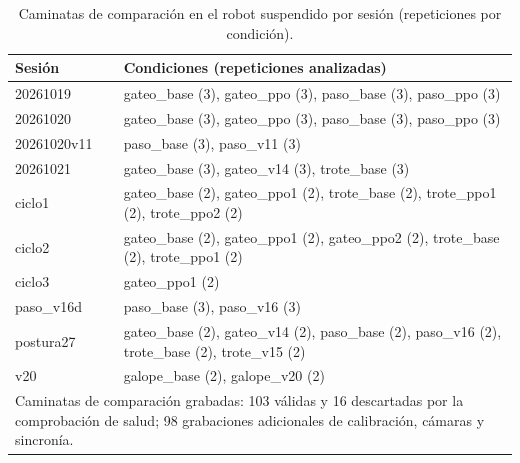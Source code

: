 \begin{table}[H]
\centering
\small
\caption{Caminatas de comparación en el robot suspendido por sesión (repeticiones por condición).}
\label{tab:inventario-ensayos}
\begin{tabular}{l>{\raggedright\arraybackslash}p{}}
\toprule
Sesión & Condiciones (repeticiones analizadas) \\
\midrule
20261019 & gateo\_base (3), gateo\_ppo (3), paso\_base (3), paso\_ppo (3) \\
20261020 & gateo\_base (3), gateo\_ppo (3), paso\_base (3), paso\_ppo (3) \\
20261020v11 & paso\_base (3), paso\_v11 (3) \\
20261021 & gateo\_base (3), gateo\_v14 (3), trote\_base (3) \\
ciclo1 & gateo\_base (2), gateo\_ppo1 (2), trote\_base (2), trote\_ppo1 (2), trote\_ppo2 (2) \\
ciclo2 & gateo\_base (2), gateo\_ppo1 (2), gateo\_ppo2 (2), trote\_base (2), trote\_ppo1 (2) \\
ciclo3 & gateo\_ppo1 (2) \\
paso\_v16d & paso\_base (3), paso\_v16 (3) \\
postura27 & gateo\_base (2), gateo\_v14 (2), paso\_base (2), paso\_v16 (2), trote\_base (2), trote\_v15 (2) \\
v20 & galope\_base (2), galope\_v20 (2) \\
\midrule
\multicolumn{2}{p{0.9\textwidth}}{\footnotesize Caminatas de comparación grabadas: 103 válidas y 16 descartadas por la comprobación de salud; 98 grabaciones adicionales de calibración, cámaras y sincronía.} \\
\bottomrule
\end{tabular}
\end{table}

